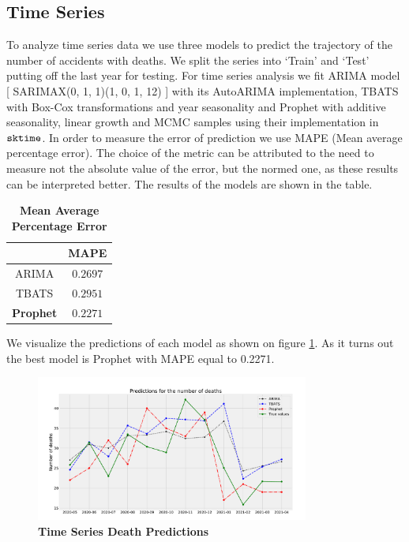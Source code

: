 \subsection{Time Series}

To analyze time series data we use three models to predict the trajectory of the number of accidents with deaths.
We split the series into ‘Train’ and ‘Test’ putting off the last year for testing.
For time series analysis we fit ARIMA model [ SARIMAX(0, 1, 1)(1, 0, 1, 12) ] with its AutoARIMA implementation,
TBATS with Box-Cox transformations and year seasonality and Prophet with additive seasonality,
linear growth and MCMC samples using their implementation in $\verb|sktime|$.
In order to measure the error of prediction we use MAPE (Mean average percentage error).
The choice of the metric can be attributed to the need to measure not the absolute value of the error, but the normed one,
as these results can be interpreted better. The results of the models are shown in the table. \\

\begin{table}[htpb]
	\centering
	\label{tab:mape}
	\begin{tabular}{|c|c|}
		\hline
		& MAPE \\
		\hline
		ARIMA & $0.2697$ \\
		TBATS	& $0.2951$ \\
		\textbf{Prophet}	& $0.2271$ \\ 
		\hline
	\end{tabular}
	\caption{\textbf{Mean Average Percentage Error}}
\end{table}
\noindent
We visualize the predictions of each model as shown on figure \ref{fig:ts_predictions}.
As it turns out the best model is Prophet with MAPE equal to 0.2271.
\begin{figure}[htpb!]
	\centering
	\includegraphics[width=0.8\textwidth]{../imgs/pdf_files/ts_predictions.pdf}
	\caption{\textbf{Time Series Death Predictions}}
	\label{fig:ts_predictions}
\end{figure}
